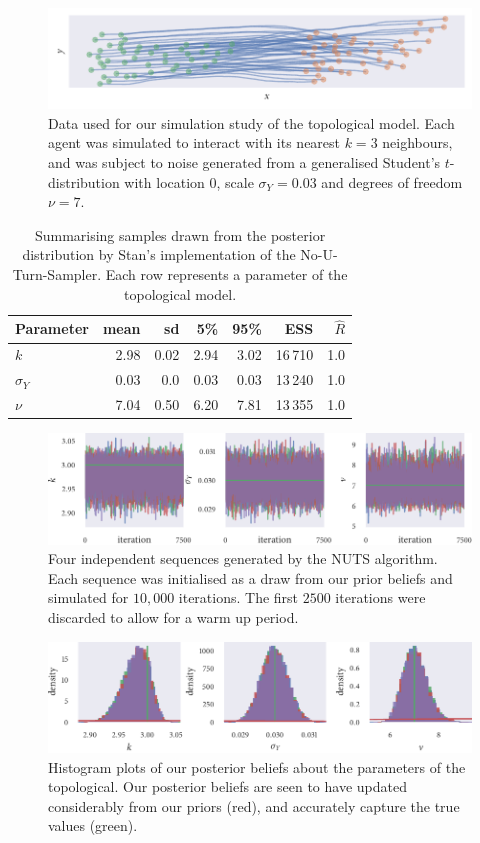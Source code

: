 \begin{figure}[tbp]
  \includegraphics{top_sim.pdf}
  \caption{Data used for our simulation study of the topological model. Each agent was
    simulated to interact with its nearest $k=3$ neighbours, and was subject to noise
    generated from a generalised Student's $t$-distribution with location $0$, scale
    $\sigma_Y=0.03$ and degrees of freedom $\nu=7$.}
  \label{fig:top_sim}
\end{figure}
\begin{table}[tbp]
  \begin{tabular}{@{}lrrrrrr@{}}
    \toprule
    Parameter    & mean & sd   & 5\%  & 95\% & ESS     & $\widehat{R}$ \\
    \midrule
    $k$          & 2.98 & 0.02 & 2.94 & 3.02 & 16\,710 & 1.0           \\
    $\sigma_{Y}$ & 0.03 & 0.0  & 0.03 & 0.03 & 13\,240 & 1.0           \\
    $\nu$        & 7.04 & 0.50 & 6.20 & 7.81 & 13\,355 & 1.0           \\
    \bottomrule
  \end{tabular}
  \caption{Summarising samples drawn from the posterior distribution by Stan's
    implementation of the No-U-Turn-Sampler. Each row represents a parameter of the
    topological model.}
\end{table}
\begin{figure}[tbp]
  \includegraphics{stan_top_trace.pdf}
  \caption{Four independent sequences generated by the NUTS algorithm. Each sequence was
    initialised as a draw from our prior beliefs and simulated for $10,000$ iterations.
    The first $2500$ iterations were discarded to allow for a warm up period.}
\end{figure}
\begin{figure}[tbp]
  \includegraphics{stan_top_hist.pdf}
  \caption{Histogram plots of our posterior beliefs about the parameters of the
    topological. Our posterior beliefs are seen to have updated considerably from our
    priors (red), and accurately capture the true values (green).}
\end{figure}

